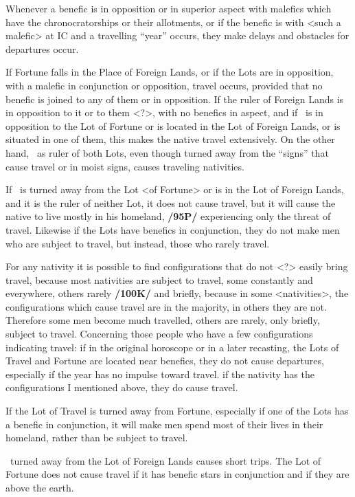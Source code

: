 Whenever a benefic is in opposition or in superior aspect with malefics which have the chronocratorships or their allotments, or if the benefic is with <such a malefic> at IC and a travelling “year” occurs, they make delays and obstacles for departures occur.

If Fortune falls in the Place of Foreign Lands, or if the Lots are in opposition, with a malefic in conjunction or opposition, travel occurs, provided that no benefic is joined to any of them or in opposition. If the ruler of Foreign Lands is in opposition to it or to them <?>, with no benefics in aspect, and if \Mars\, is in opposition to the Lot of Fortune or is located in the Lot of Foreign Lands, or is situated in one of them, this makes the native travel extensively. On the other hand, \Mars\, as ruler of both Lots, even though turned away from the “signs” that cause travel or in moist signs, causes traveling nativities. 

If \Mars\, is turned away from the Lot <of Fortune> or is in the Lot of Foreign Lands, and it is the ruler of neither Lot, it does not cause travel, but it will cause the native to live mostly in his homeland, \textbf{/95P/} experiencing
only the threat of travel. Likewise if the Lots have benefics in conjunction, they do not make men who are subject to travel, but instead, those who rarely travel.

For any nativity it is possible to find configurations that do not <?> easily bring travel, because most nativities are subject to travel, some constantly and everywhere, others rarely \textbf{/100K/} and briefly, because in some <nativities>, the configurations which cause travel are in the majority, in others they are not. Therefore some men become much travelled, others are rarely, only briefly, subject to travel. Concerning those people who have a few configurations indicating travel: if in the original horoscope or in a later
recasting, the Lots of Travel and Fortune are located near benefics, they do not cause departures, especially if the year has no impulse toward travel. if the nativity has the configurations I mentioned above, they do cause travel. 

If the Lot of Travel is turned away from Fortune, especially if one of the Lots has a benefic in conjunction, it will make men spend most of their lives in their homeland, rather than be subject to travel.

\Mars\, turned away from the Lot of Foreign Lands causes short trips. The Lot of Fortune does not cause travel if it has benefic stars in conjunction and if they are above the earth.

